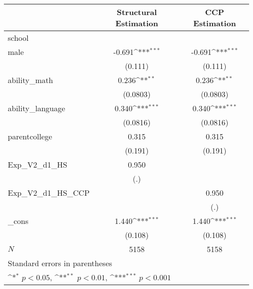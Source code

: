 {
\def\sym#1{\ifmmode^{#1}\else\(^{#1}\)\fi}
\begin{tabular}{l*{2}{c}}
\hline\hline
            &\multicolumn{1}{c}{Structural Estimation}&\multicolumn{1}{c}{CCP Estimation}\\
\hline
school      &                     &                     \\
male        &      -0.691\sym{***}&      -0.691\sym{***}\\
            &     (0.111)         &     (0.111)         \\
[1em]
ability\_math&       0.236\sym{**} &       0.236\sym{**} \\
            &    (0.0803)         &    (0.0803)         \\
[1em]
ability\_language&       0.340\sym{***}&       0.340\sym{***}\\
            &    (0.0816)         &    (0.0816)         \\
[1em]
parentcollege&       0.315         &       0.315         \\
            &     (0.191)         &     (0.191)         \\
[1em]
Exp\_V2\_d1\_HS&       0.950         &                     \\
            &         (.)         &                     \\
[1em]
Exp\_V2\_d1\_HS\_CCP&                     &       0.950         \\
            &                     &         (.)         \\
[1em]
\_cons      &       1.440\sym{***}&       1.440\sym{***}\\
            &     (0.108)         &     (0.108)         \\
\hline
\(N\)       &        5158         &        5158         \\
\hline\hline
\multicolumn{3}{l}{\footnotesize Standard errors in parentheses}\\
\multicolumn{3}{l}{\footnotesize \sym{*} \(p<0.05\), \sym{**} \(p<0.01\), \sym{***} \(p<0.001\)}\\
\end{tabular}
}
